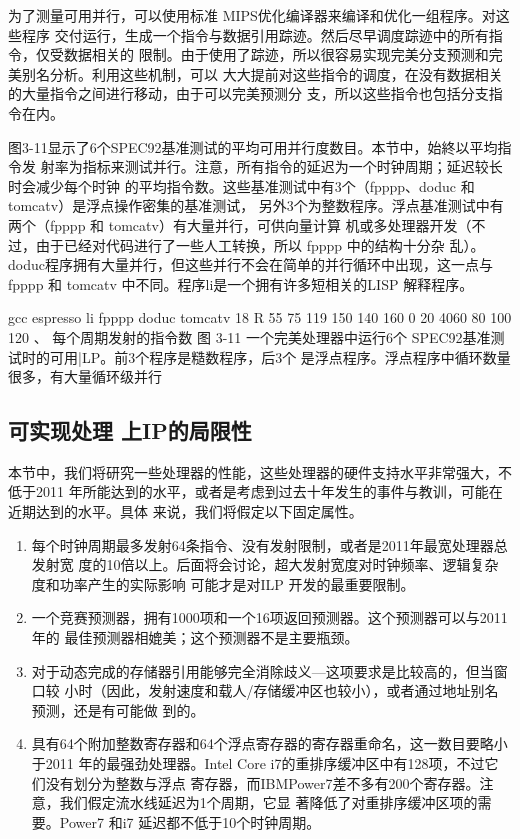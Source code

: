 为了测量可用并行，可以使用标准 MIPS优化编译器来编译和优化一组程序。对这些程序
交付运行，生成一个指令与数据引用踪迹。然后尽早调度踪迹中的所有指令，仅受数据相关的
限制。由于使用了踪迹，所以很容易实现完美分支预测和完美别名分析。利用这些机制，可以
大大提前对这些指令的调度，在没有数据相关的大量指令之间进行移动，由于可以完美预测分
支，所以这些指令也包括分支指令在内。

图3-11显示了6个SPEC92基准测试的平均可用并行度数目。本节中，始終以平均指令发
射率为指标来测试并行。注意，所有指令的延迟为一个时钟周期；延迟较长时会减少每个时钟
的平均指令数。这些基准测试中有3个（fpppp、doduc 和 tomcatv）是浮点操作密集的基准测试，
另外3个为整数程序。浮点基准测试中有两个（fpppp 和 tomcatv）有大量并行，可供向量计算
机或多处理器开发（不过，由于已经对代码进行了一些人工转换，所以 fpppp 中的结构十分杂
乱）。doduc程序拥有大量并行，但这些并行不会在简单的并行循环中出现，这一点与 fpppp 和
tomcatv 中不同。程序li是一个拥有许多短相关的LISP 解释程序。

gcc
espresso
li
fpppp
doduc
tomcatv
18
R 55
75
119
150
140 160
0
20
4060 80 100 120
、
每个周期发射的指令数
图 3-11 一个完美处理器中运行6个 SPEC92基准测试时的可用|LP。前3个程序是糙数程序，后3个
是浮点程序。浮点程序中循环数量很多，有大量循环级并行

\subsection{可实现处理 上IP的局限性}

本节中，我们将研究一些处理器的性能，这些处理器的硬件支持水平非常强大，不低于2011
年所能达到的水平，或者是考虑到过去十年发生的事件与教训，可能在近期达到的水平。具体
来说，我们将假定以下固定属性。

\begin{enumerate}
    \item 每个时钟周期最多发射64条指令、没有发射限制，或者是2011年最宽处理器总发射宽
    度的10倍以上。后面将会讨论，超大发射宽度对时钟频率、逻辑复杂度和功率产生的实际影响
    可能才是对ILP 开发的最重要限制。
    \item  一个竞赛预测器，拥有1000项和一个16项返回预测器。这个预测器可以与2011年的
    最佳预测器相媲美；这个预测器不是主要瓶颈。
    \item  对于动态完成的存储器引用能够完全消除歧义—这项要求是比较高的，但当窗口较
    小时（因此，发射速度和载人/存储缓冲区也较小），或者通过地址别名预测，还是有可能做
    到的。
    \item 具有64个附加整数寄存器和64个浮点寄存器的寄存器重命名，这一数目要略小于2011
    年的最强劲处理器。Intel Core i7的重排序缓冲区中有128项，不过它们没有划分为整数与浮点
    寄存器，而IBMPower7差不多有200个寄存器。注意，我们假定流水线延迟为1个周期，它显
    著降低了对重排序缓冲区项的需要。Power7 和i7 延迟都不低于10个时钟周期。
\end{enumerate}

